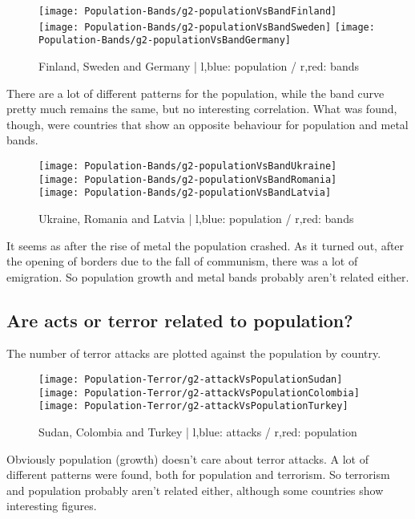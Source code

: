 \begin{figure}[ht!]
	\texttt{[image: Population-Bands/g2-populationVsBandFinland]}
	\centering
	\texttt{[image: Population-Bands/g2-populationVsBandSweden]}
	\texttt{[image: Population-Bands/g2-populationVsBandGermany]}
	\caption{Finland, Sweden and Germany | l,blue: population / r,red: bands}
\end{figure}

There are a lot of different patterns for the population, while the band curve pretty much remains the same, but no interesting correlation. What was found, though, were countries that show an opposite behaviour for population and metal bands.

\begin{figure}[hbt!]
	\texttt{[image: Population-Bands/g2-populationVsBandUkraine]}
	\centering
	\texttt{[image: Population-Bands/g2-populationVsBandRomania]}
	\texttt{[image: Population-Bands/g2-populationVsBandLatvia]}
	\caption{Ukraine, Romania and Latvia | l,blue: population / r,red: bands}
\end{figure}
It seems as after the rise of metal the population crashed. As it turned out, after the opening of borders due to the fall of communism, there was a lot of emigration. So population growth and metal bands probably aren't related either.

\newpage

\subsection{Are acts or terror related to population?}
The number of terror attacks are plotted against the population by country.

\begin{figure}[hbt!]
	\texttt{[image: Population-Terror/g2-attackVsPopulationSudan]}
	\centering
	\texttt{[image: Population-Terror/g2-attackVsPopulationColombia]}
	\texttt{[image: Population-Terror/g2-attackVsPopulationTurkey]}
	\caption{Sudan, Colombia and Turkey | l,blue: attacks / r,red: population}
\end{figure}

Obviously population (growth) doesn't care about terror attacks. A lot of different patterns were found, both for population and terrorism. So terrorism and population probably aren't related either, although some countries show interesting figures.

